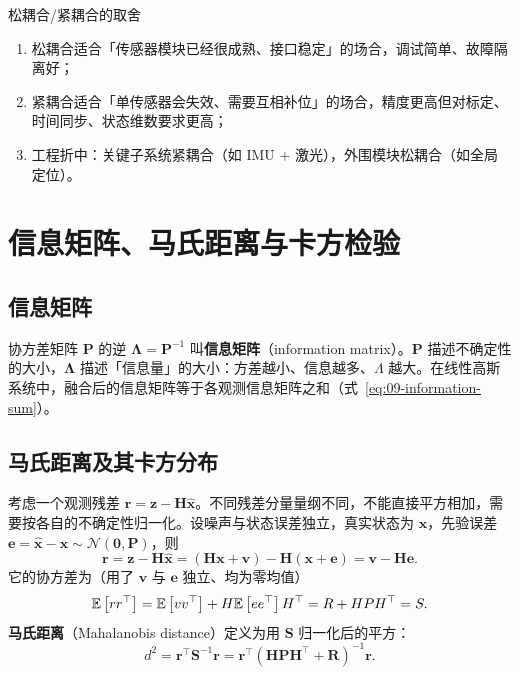 \begin{keybox}{松耦合/紧耦合的取舍}
\begin{enumerate}
  \item 松耦合适合「传感器模块已经很成熟、接口稳定」的场合，调试简单、故障隔离好；
  \item 紧耦合适合「单传感器会失效、需要互相补位」的场合，精度更高但对标定、时间同步、状态维数要求更高；
  \item 工程折中：关键子系统紧耦合（如 IMU + 激光），外围模块松耦合（如全局定位）。
\end{enumerate}
\end{keybox}

\section{信息矩阵、马氏距离与卡方检验}\label{sec:09-mahalanobis}

\subsection{信息矩阵}

\begin{definition}[信息矩阵]
协方差矩阵 $\bm{P}$ 的逆 $\bm{\Lambda}=\bm{P}^{-1}$ 叫\textbf{信息矩阵}（information matrix）。$\bm{P}$ 描述不确定性的大小，$\bm{\Lambda}$ 描述「信息量」的大小：方差越小、信息越多、$\Lambda$ 越大。在线性高斯系统中，融合后的信息矩阵等于各观测信息矩阵之和（式~\eqref{eq:09-information-sum}）。
\end{definition}

\subsection{马氏距离及其卡方分布}

考虑一个观测残差 $\bm{r}=\bm{z}-\bm{H}\hat{\bm{x}}$。不同残差分量量纲不同，不能直接平方相加，需要按各自的不确定性归一化。设噪声与状态误差独立，真实状态为 $\bm{x}$，先验误差 $\bm{e}=\hat{\bm{x}}-\bm{x}\sim\mathcal{N}(\bm{0},\bm{P})$，则
\begin{equation}
  \bm{r} = \bm{z}-\bm{H}\hat{\bm{x}}
  = \left(\bm{H}\bm{x}+\bm{v}\right)-\bm{H}\left(\bm{x}+\bm{e}\right)
  = \bm{v}-\bm{H}\bm{e}.
  \label{eq:09-residual}
\end{equation}
它的协方差为（用了 $\bm{v}$ 与 $\bm{e}$ 独立、均为零均值）
\begin{equation}
  \mathbb{E}\left[rr^{\top}\right]
  = \mathbb{E}\left[vv^{\top}\right]+H\mathbb{E}\left[ee^{\top}\right]H^{\top}
  = R+HPH^{\top} = S.
  \label{eq:09-S}
\end{equation}
\textbf{马氏距离}（Mahalanobis distance）定义为用 $\bm{S}$ 归一化后的平方：
\begin{equation}
  d^{2} = \bm{r}^{\top}\bm{S}^{-1}\bm{r}
  = \bm{r}^{\top}\left(\bm{H}\bm{P}\bm{H}^{\top}+\bm{R}\right)^{-1}\bm{r}.
  \label{eq:09-mahalanobis}
\end{equation}

